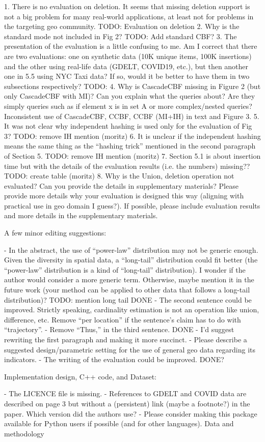 1. There is no evaluation on deletion. It seems that missing deletion support is not a big problem for many real-world applications, at least not for problems in the targeting geo community.
TODO: Evaluation on deletion
2. Why is the standard mode not included in Fig 2?
TODO: Add standard CBF? 
3. The presentation of the evaluation is a little confusing to me. Am I correct that there are two evaluations: one on synthetic data (10K unique items, 100K insertions) and the other using real-life data (GDELT, COVID19, etc.), but then another one in 5.5 using NYC Taxi data? If so, would it be better to have them in two subsections respectively?
TODO: 
4. Why is CascadeCBF missing in Figure 2 (but only CascadeCBF with MI)? Can you explain what the queries about? Are they simply queries such as if element x is in set A or more complex/nested queries? Inconsistent use of CascadeCBF, CCBF, CCBF (MI+IH) in text and Figure 3.
5. It was not clear why independent hashing is used only for the evaluation of Fig 3?  TODO: remove IH mention (moritz)
6. It is unclear if the independent hashing means the same thing as the “hashing trick” mentioned in the second paragraph of Section 5. TODO: remove IH mention (moritz)
7. Section 5.1 is about insertion time but with the details of the evaluation results (i.e. the numbers) missing?? TODO: create table (moritz)
8. Why is the Union, deletion operation not evaluated? Can you provide the details in supplementary materials? Please provide more details why your evaluation is designed this way (aligning with practical use in geo domain I guess?). If possible, please include evaluation results and more details in the supplementary materials.


A few minor editing suggestions:

- In the abstract, the use of “power-law” distribution may not be generic enough. Given the diversity in spatial data, a “long-tail” distribution could fit better (the “power-law” distribution is a kind of “long-tail” distribution). I wonder if the author would consider a more generic term. Otherwise, maybe mention it in the future work (your method can be applied to other data that follows a long-tail distribution)?
TODO: mention long tail DONE
- The second sentence could be improved. Strictly speaking, cardinality estimation is not an operation like union, difference, etc. Remove “per location” if the sentence’s claim has to do with “trajectory”.
- Remove “Thus,” in the third sentence. DONE
- I’d suggest rewriting the first paragraph and making it more succinct.
- Please describe a suggested design/parametric setting for the use of general geo data regarding its indicators.
- The writing of the evaluation could be improved. DONE?

Implementation design, C++ code, and Dataset:

- The LICENCE file is missing.
- References to GDELT and COVID data are described on page 3 but without a (persistent) link (maybe a footnote?) in the paper. Which version did the authors use?
- Please consider making this package available for Python users if possible (and for other languages).
Data and methodology	